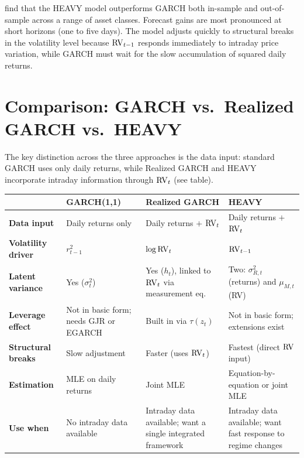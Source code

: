 \begin{keyresult}
\citet{shephard2010heavy} find that the HEAVY model outperforms GARCH both in-sample
and out-of-sample across a range of asset classes. Forecast gains are most pronounced
at short horizons (one to five days). The model adjusts quickly to structural breaks
in the volatility level because $\operatorname{RV}_{t-1}$ responds immediately to intraday price
variation, while GARCH must wait for the slow accumulation of squared daily returns.
\end{keyresult}


\section{Comparison: GARCH vs.\ Realized GARCH vs.\ HEAVY}
\label{sec:comparison}

The key distinction across the three approaches is the data input: standard GARCH
uses only daily returns, while Realized GARCH and HEAVY incorporate intraday
information through $\operatorname{RV}_t$ (see table).

\begin{center}
\renewcommand{\arraystretch}{1.3}
\begin{tabular}{@{} l p{3.2cm} p{3.2cm} p{3.2cm} @{}}
\toprule
& \textbf{GARCH(1,1)} & \textbf{Realized GARCH} & \textbf{HEAVY} \\
\midrule
\textbf{Data input}
  & Daily returns only
  & Daily returns $+$ $\operatorname{RV}_t$
  & Daily returns $+$ $\operatorname{RV}_t$ \\[2pt]
\textbf{Volatility driver}
  & $r^2_{t-1}$
  & $\log \operatorname{RV}_t$
  & $\operatorname{RV}_{t-1}$ \\[2pt]
\textbf{Latent variance}
  & Yes ($\sigma^2_t$)
  & Yes ($h_t$), linked to $\operatorname{RV}_t$ via measurement eq.
  & Two: $\sigma^2_{R,t}$ (returns) and $\mu_{M,t}$ (RV) \\[2pt]
\textbf{Leverage effect}
  & Not in basic form; needs GJR or EGARCH
  & Built in via $\tau(z_t)$
  & Not in basic form; extensions exist \\[2pt]
\textbf{Structural breaks}
  & Slow adjustment
  & Faster (uses $\operatorname{RV}_t$)
  & Fastest (direct $\operatorname{RV}$ input) \\[2pt]
\textbf{Estimation}
  & MLE on daily returns
  & Joint MLE
  & Equation-by-equation or joint MLE \\[2pt]
\textbf{Use when}
  & No intraday data available
  & Intraday data available; want a single integrated framework
  & Intraday data available; want fast response to regime changes \\
\bottomrule
\end{tabular}
\end{center}


